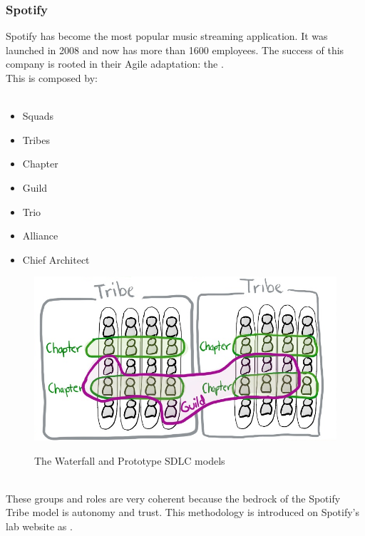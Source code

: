 	\subsubsection{Spotify}
		Spotify has become the most popular music streaming application.
		It was launched in 2008 and now has more than 1600 employees.
		The success of this company is rooted in their Agile adaptation: the .\\
		This is composed by:\\\\
		\begin{minipage}[c]{0.25\textwidth}
			\begin{itemize}
				\item Squads
				\item Tribes
				\item Chapter
				\item Guild
				\item Trio
				\item Alliance
				\item Chief Architect
			\end{itemize}
		\end{minipage}
		\hfill
		\begin{minipage}[c]{0.70\textwidth}
			\vspace{-2cm}
			\begin{figure}[H]
				\centering
				\includegraphics[width=\textwidth]{resources/spot}\\
				\caption{The Waterfall and Prototype SDLC models}
			\end{figure}
		\end{minipage}\\
		These groups and roles are very coherent because the bedrock of the Spotify Tribe model is autonomy and trust\cite{exploring-key-elements-of-spotifys}.
		This methodology is introduced on Spotify's lab website as \cite{spotify-engineering-culture}.
		
